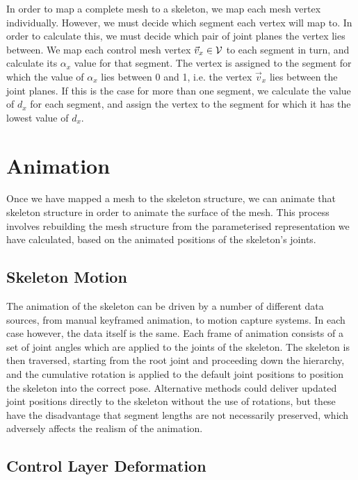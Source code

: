 In order to map a complete mesh to a skeleton, we map each mesh vertex individually. However, we must decide which segment each vertex will map to. In order to calculate this, we must decide which pair of joint planes the vertex lies between. We map each control mesh vertex $\vec{v}_x \in {\cal V}$ to each segment in turn, and calculate its $\alpha_x$ value for that segment. The vertex is assigned to the segment for which the value of $\alpha_x$ lies between 0 and 1, i.e. the vertex $\vec{v}_x$ lies between the joint planes. If this is the case for more than one segment, we calculate the value of $d_x$ for each segment, and assign the vertex to the segment for which it has the lowest value of $d_x$.

\section{\label{sec:skeletalanim:anim}Animation}

Once we have mapped a mesh to the skeleton structure, we can animate that skeleton structure in order to animate the surface of the mesh. This process involves rebuilding the mesh structure from the parameterised representation we have calculated, based on the animated positions of the skeleton's joints.

\subsection{\label{sec:skeletalanim:anim:skeleton}Skeleton Motion}

The animation of the skeleton can be driven by a number of different data sources, from manual keyframed animation, to motion capture systems. In each case however, the data itself is the same. Each frame of animation consists of a set of joint angles which are applied to the joints of the skeleton. The skeleton is then traversed, starting from the root joint and proceeding down the hierarchy, and the cumulative rotation is applied to the default joint positions to position the skeleton into the correct pose. Alternative methods could deliver updated joint positions directly to the skeleton without the use of rotations, but these have the disadvantage that segment lengths are not necessarily preserved, which adversely affects the realism of the animation.

\subsection{\label{sec:skeletalanim:anim:control}Control Layer Deformation}

